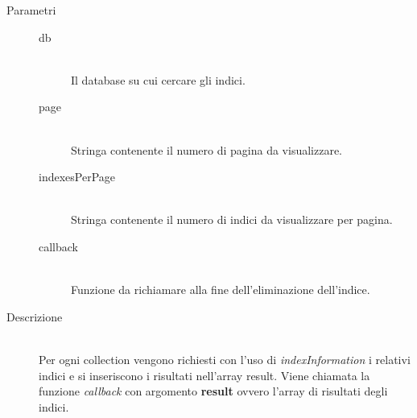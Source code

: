\begin{description}
\begin{mldescription}
          \begin{description}
      	 \item[Parametri] \hfill
      	  \begin{description}
      	   \item[db] \hfill \\
      	   Il database su cui cercare gli indici.
      	   \item[page] \hfill \\
      	   Stringa contenente il numero di pagina da visualizzare.
      	   \item[indexesPerPage] \hfill \\
      	   Stringa contenente il numero di indici da visualizzare per pagina.
      	   \item[callback] \hfill \\
      	   Funzione da richiamare alla fine dell'eliminazione dell'indice.
      	  \end{description}
      	 \item[Descrizione] \hfill \\
      	 Per ogni collection vengono richiesti con l'uso di \textit{indexInformation} i relativi indici e si inseriscono i risultati nell'array result. Viene chiamata la funzione \textit{callback} con argomento \textbf{result} ovvero l'array di risultati degli indici.  	 
      	\end{description} 	   
    

\end{mldescription}
\end{description}
